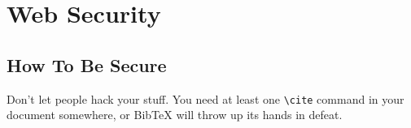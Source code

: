 \section{Web Security}

\subsection{How To Be Secure}

Don't let people hack your stuff. \cite{textbook} You need at least one \verb+\cite+ command in your document somewhere, or BibTeX will throw up its hands in defeat.
